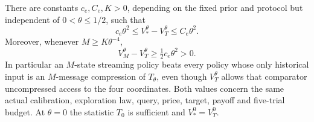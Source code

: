 \begin{theorem}\label{thm:resolved-value}
There are constants $c_e,C_e,K>0$, depending on the fixed prior and
protocol but independent of $0<\theta\le1/2$, such that
\begin{equation}\label{eq:erasure-value}
 c_e\theta^2\le V_*^\theta-V_T^\theta\le C_e\theta^2.
\end{equation}
Moreover, whenever $M\ge K\theta^{-4}$,
\begin{equation}\label{eq:finite-state-advantage}
 V_M^\theta-V_T^\theta\ge\tfrac12c_e\theta^2>0.
\end{equation}
In particular an $M$-state streaming policy beats every policy whose only
historical input is an $M$-message compression of $T_\theta$, even though
$V_T^\theta$ allows that comparator uncompressed access to the four
coordinates. Both values concern the same actual calibration, exploration
law, query, price, target, payoff and five-trial budget. At $\theta=0$ the
statistic $T_0$ is sufficient and $V_*^0=V_T^0$.
\end{theorem}
